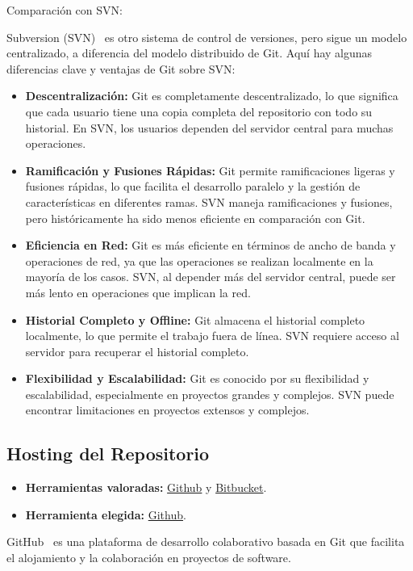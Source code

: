 Comparación con SVN:

Subversion (SVN)~\cite{misc:SVN} es otro sistema de control de versiones, pero sigue un modelo centralizado, a diferencia del modelo distribuido de Git. Aquí hay algunas diferencias clave y ventajas de Git sobre SVN:
\begin{itemize}
	\item \textbf{Descentralización:}
Git es completamente descentralizado, lo que significa que cada usuario tiene una copia completa del repositorio con todo su historial. En SVN, los usuarios dependen del servidor central para muchas operaciones.

\item \textbf{Ramificación y Fusiones Rápidas:}
Git permite ramificaciones ligeras y fusiones rápidas, lo que facilita el desarrollo paralelo y la gestión de características en diferentes ramas. SVN maneja ramificaciones y fusiones, pero históricamente ha sido menos eficiente en comparación con Git.

\item \textbf{Eficiencia en Red:}
Git es más eficiente en términos de ancho de banda y operaciones de red, ya que las operaciones se realizan localmente en la mayoría de los casos. SVN, al depender más del servidor central, puede ser más lento en operaciones que implican la red.

\item \textbf{Historial Completo y Offline:}
Git almacena el historial completo localmente, lo que permite el trabajo fuera de línea. SVN requiere acceso al servidor para recuperar el historial completo.

\item \textbf{Flexibilidad y Escalabilidad:}
Git es conocido por su flexibilidad y escalabilidad, especialmente en proyectos grandes y complejos. SVN puede encontrar limitaciones en proyectos extensos y complejos.
\end{itemize}


\subsection{Hosting del Repositorio}
\begin{itemize}
    \item \textbf{Herramientas valoradas:} \href{https://github.com/}{Github} y \href{https://bitbucket.org/product/}{Bitbucket}.
    \item \textbf{Herramienta elegida:} \href{https://github.com/}{Github}.
\end{itemize}
GitHub~\cite{misc:Github} es una plataforma de desarrollo colaborativo basada en Git que facilita el alojamiento y la colaboración en proyectos de software. 

